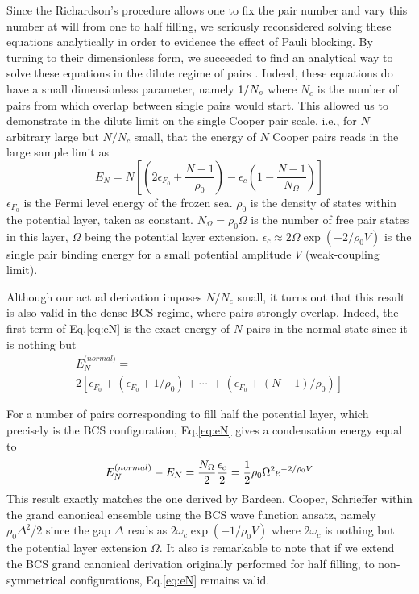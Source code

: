 \documentclass[aps,prb,superscriptaddress,showpacs,reprint,lengthcheck]{revtex4-1}
\begin{document}
Since the Richardson's procedure allows one to fix the pair number and vary 
this number at will from one to half filling, we seriously reconsidered 
solving these equations analytically in order to evidence the effect of Pauli blocking. By turning to their dimensionless form, we succeeded to
find an analytical way to solve these equations in the dilute regime of
pairs \cite{paper1}. Indeed, these equations do have a small dimensionless parameter, namely $1/{%
N_{c}}$ where $N_{c}$ is the number of pairs from which overlap between single pairs would start. 
This allowed us to demonstrate in the dilute limit on
the single Cooper pair scale, i.e., for $N$ arbitrary large but $N/N_{c}$ small, that the energy of $%
N$ Cooper pairs reads in the large sample limit as 
\begin{equation}
E_{N}=N\left[ \left( 2\epsilon _{F_{0}}+\frac{N-1}{\rho _{0}}%
\right)-\epsilon _{c}\left( 1-\frac{N-1}{N_{\Omega }}\right) \right]
\label{eq:eN}
\end{equation}%
$\epsilon _{F_{0}}$ is the Fermi level energy of the frozen sea.  $\rho
_{0} $ is the density of states within the potential
layer, taken as constant. $N_{\Omega }=\rho _{0}\Omega $ is the number of free pair states in this
layer, $\Omega $ being the potential layer extension. $\epsilon _{c}\approx
2\Omega \exp \left( -2/\rho _{0}V\right) $ is the single pair binding
energy for a small potential amplitude $V$ (weak-coupling limit).

Although our actual derivation imposes $N/N_{c}$ small, it turns out that this result is also valid in the dense BCS regime,
where pairs strongly overlap. Indeed, the first term of Eq.\eqref{eq:eN} is
the exact energy of $N$ pairs in the normal state since it is nothing but 
\begin{multline}
{E}_{N}^{\text{(}normal)}= \\
2\left[\epsilon _{F_{0}}+\left( \epsilon _{F_{0}}+1/\rho _{0}\right) +\cdots
\;+\left( \epsilon _{F_{0}}+(N-1)/\rho _{0}\right)\right]
\end{multline}%

For a number of pairs corresponding to fill half the potential layer, which precisely is 
the BCS configuration, Eq.\eqref{eq:eN} gives a condensation
energy equal to 
\begin{equation}
{E}_{N}^{\text{(}normal)}-{E}_{N}=\frac{N_{\Omega }}{2}\frac{%
\epsilon _{c}}{2}=\frac{1}{2}\rho _{0}\Omega ^{2}e^{-2/\rho _{0}V}
\end{equation}%
This result exactly matches the one derived by Bardeen, Cooper, Schrieffer within the grand canonical
ensemble using the BCS wave function ansatz, namely $\rho _{0}\Delta ^{2}/2$ since the gap $\Delta $ reads as $%
2\omega _{c}\exp \left( -1/\rho _{0}V\right) $ where $2\omega _{c}$ is nothing but the
potential layer extension $\Omega $. It also is remarkable to 
note that if we extend the BCS grand canonical derivation originally performed for half filling, to
non-symmetrical configurations, Eq.\eqref{eq:eN} remains valid.
\end{document}
